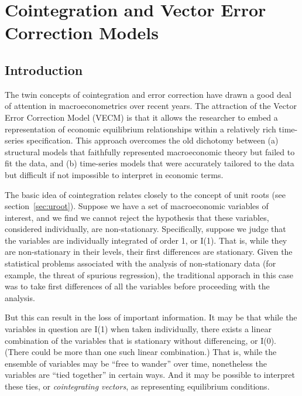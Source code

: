 \chapter{Cointegration and Vector Error Correction Models}
\label{chap:vecm}

\section{Introduction}
\label{sec:VECM-intro}

The twin concepts of cointegration and error correction have drawn a
good deal of attention in macroeconometrics over recent years.  The
attraction of the Vector Error Correction Model (VECM) is that it
allows the researcher to embed a representation of economic
equilibrium relationships within a relatively rich time-series
specification.  This approach overcomes the old dichotomy between (a)
structural models that faithfully represented macroeconomic theory but
failed to fit the data, and (b) time-series models that were
accurately tailored to the data but difficult if not impossible to
interpret in economic terms.

The basic idea of cointegration relates closely to the concept of unit
roots (see section~\ref{sec:uroot}).  Suppose we have a set of
macroeconomic variables of interest, and we find we cannot reject the
hypothesis that these variables, considered individually, are
non-stationary.  Specifically, suppose we judge that the
variables are individually integrated of order 1, or I(1).  That is,
while they are non-stationary in their levels, their first differences
are stationary.  Given the statistical problems associated with the
analysis of non-stationary data (for example, the threat of spurious
regression), the traditional apporach in this case was to take first
differences of all the variables before proceeding with the analysis.

But this can result in the loss of important information.  It may be
that while the variables in question are I(1) when taken individually,
there exists a linear combination of the variables that is stationary
without differencing, or I(0).  (There could be more than one such
linear combination.)  That is, while the ensemble of variables may be
``free to wander'' over time, nonetheless the variables are ``tied
together'' in certain ways.  And it may be possible to interpret these
ties, or \emph{cointegrating vectors}, as representing equilibrium
conditions.

